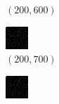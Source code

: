 \documentclass[a4paper, landscape]{article}
\begin{document}
\begin{figure}[H]
\begin{subfigure}{0.09\linewidth}
        \caption*{$(200, 600)$}
    \end{subfigure}
    \begin{subfigure}{0.09\linewidth}
        \centering
        \includegraphics[width=\linewidth]{iht/k = 200, m = 700.png}
        \caption*{$(200, 700)$}
    \end{subfigure}
    \begin{subfigure}{0.09\linewidth}
        \centering
        \includegraphics[width=\linewidth]{iht/k = 200, m = 800.png}

\end{subfigure}
\end{figure}
\end{document}

